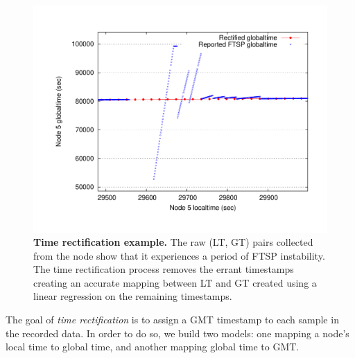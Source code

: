 \begin{figure}[t]
\label{evaluation-fig-rectificationprocess}
\begin{center}
\includegraphics[width=\hsize]{./5-evaluation/figs/timing/MDW/rectification/rectify.pdf}
\end{center}
\caption{\textbf{Time rectification example.}
The raw (LT, GT) pairs collected from the node show that it experiences a
period of FTSP instability.  The time rectification process removes the
errant timestamps creating an accurate mapping between LT and GT created
using a linear regression on the remaining timestamps.}
\end{figure}

The goal of {\em time rectification} is to assign a GMT timestamp to each
sample in the recorded data. In order to do so, we build two models: one
mapping a node's local time to global time, and another mapping global time
to GMT. 


